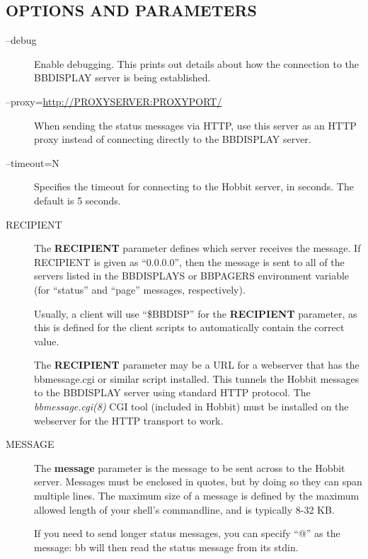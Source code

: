 \subsection{OPTIONS AND PARAMETERS}
\begin{description}

\item[--debug] Enable debugging. This prints out details about how the
  connection to the BBDISPLAY server is being established. 

\item[--proxy=\url{http://PROXYSERVER:PROXYPORT/}] When sending the
  status messages via HTTP, use this server as an HTTP proxy instead
  of connecting directly to the BBDISPLAY server. 

\item[--timeout=N] Specifies the timeout for connecting to the Hobbit
  server, in seconds. The default is 5 seconds. 

\item[RECIPIENT] The \textbf{RECIPIENT}
 parameter defines which server receives the message. If RECIPIENT is
 given as ``0.0.0.0'', then the message is sent to all of the servers
 listed in the BBDISPLAYS or BBPAGERS environment variable (for
 ``status'' and ``page'' messages, respectively). 

Usually, a client will use ``\$BBDISP'' for the \textbf{RECIPIENT}
parameter, as this is defined for the client scripts to automatically
contain the correct value. 


The \textbf{RECIPIENT} parameter may be a URL for a webserver that
has the bbmessage.cgi or similar script installed. This tunnels the
Hobbit messages to the BBDISPLAY server using standard HTTP
protocol. The \emph{bbmessage.cgi(8)} CGI tool (included in Hobbit)
must be installed on the webserver for the HTTP transport to work.  


\item[MESSAGE] The \textbf{message} parameter is the message to be
  sent across to the Hobbit server. Messages must be enclosed in
  quotes, but by doing so they can span multiple lines. The maximum
  size of a message is defined by the maximum allowed length of your
  shell's commandline, and is typically  8-32 KB. 

If you need to send longer status messages, you can specify ``@'' as
the message: bb will then read the status message from its stdin. 


\end{description}

